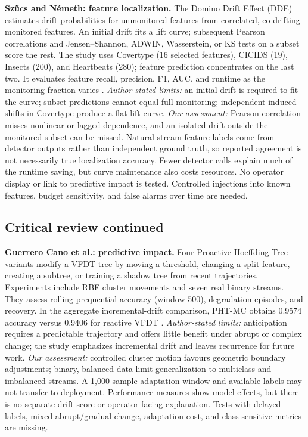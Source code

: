 \documentclass[10pt,a4paper]{article}
\begin{document}
\textbf{Sz\H{u}cs and N\'emeth: feature localization.} The Domino Drift Effect (DDE) estimates drift probabilities for unmonitored features from correlated, co-drifting monitored features. An initial drift fits a lift curve; subsequent Pearson correlations and Jensen--Shannon, ADWIN, Wasserstein, or KS tests on a subset score the rest. The study uses Covertype (16 selected features), CICIDS (19), Insects (200), and Heartbeats (280); feature prediction concentrates on the last two. It evaluates feature recall, precision, F1, AUC, and runtime as the monitoring fraction varies \cite{szucs}. \emph{Author-stated limits:} an initial drift is required to fit the curve; subset predictions cannot equal full monitoring; independent induced shifts in Covertype produce a flat lift curve. \emph{Our assessment:} Pearson correlation misses nonlinear or lagged dependence, and an isolated drift outside the monitored subset can be missed. Natural-stream feature labels come from detector outputs rather than independent ground truth, so reported agreement is not necessarily true localization accuracy. Fewer detector calls explain much of the runtime saving, but curve maintenance also costs resources. No operator display or link to predictive impact is tested. Controlled injections into known features, budget sensitivity, and false alarms over time are needed.

\newpage
\subsection*{Critical review continued}
\textbf{Guerrero Cano et al.: predictive impact.} Four Proactive Hoeffding Tree variants modify a VFDT tree by moving a threshold, changing a split feature, creating a subtree, or training a shadow tree from recent trajectories. Experiments include RBF cluster movements and seven real binary streams. They assess rolling prequential accuracy (window 500), degradation episodes, and recovery. In the aggregate incremental-drift comparison, PHT-MC obtains 0.9574 accuracy versus 0.9406 for reactive VFDT \cite{guerrero}. \emph{Author-stated limits:} anticipation requires a predictable trajectory and offers little benefit under abrupt or complex change; the study emphasizes incremental drift and leaves recurrence for future work. \emph{Our assessment:} controlled cluster motion favours geometric boundary adjustments; binary, balanced data limit generalization to multiclass and imbalanced streams. A 1,000-sample adaptation window and available labels may not transfer to deployment. Performance measures show model effects, but there is no separate drift score or operator-facing explanation. Tests with delayed labels, mixed abrupt/gradual change, adaptation cost, and class-sensitive metrics are missing.
\end{document}
